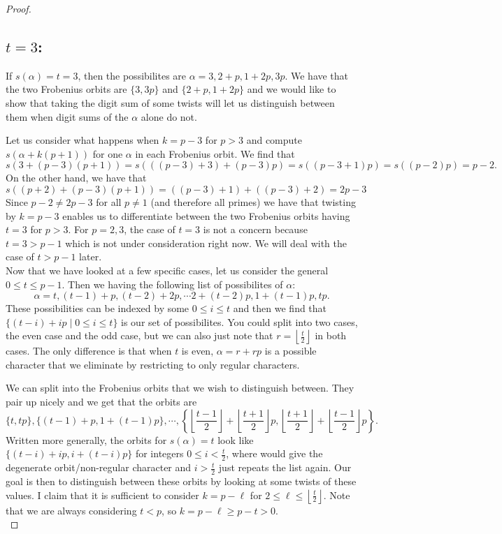 \documentclass[12pt]{article}
\theoremstyle{customtheorem}%
\theoremstyle{remark}
\theoremstyle{definition}
\numberwithin{equation}{section}
\numberwithin{theorem}{section}
\begin{document}
\begin{proof}
\subsection{$t = 3$:} If $s(\alpha) = t= 3$, then the possibilites are $\alpha = 3,2+p,1+2p,3p$. 
We have that the two Frobenius orbits are $\{3,3p\}$ and $\{2+p, 1+2p\}$ and we would like to show that taking the digit sum of some twists will let us distinguish between them when digit sums of the $\alpha$ alone do not.

Let us consider what happens when $k = p-3$ for $p > 3$ and compute $s(\alpha + k(p+1))$ for one $\alpha$ in each Frobenius orbit. 
We find that \[s(3 + (p-3)(p+1)) = s(((p-3)+3)+(p-3)p) = s((p-3+1)p) = s((p-2)p) = p-2.\] 
On the other hand, we have that \[s((p+2)+(p-3)(p+1)) = ((p-3)+1) + ((p-3)+2) =2p-3\]
Since $p-2 \neq 2p-3$ for all $p \neq 1$ (and therefore all primes) we have that twisting by $k = p-3$ enables us to differentiate between the two Frobenius orbits having $t = 3$ for $p > 3$. 
For $p = 2,3$, the case of $t = 3$ is not a concern because $t =3 > p-1$ which is not under consideration right now. 
We will deal with the case of $t > p-1$ later.
\\

Now that we have looked at a few specific cases, let us consider the general $0 \leq t \leq p-1$. 
Then we having the following list of possibilites of $\alpha$: \[\alpha = t, (t-1) + p, (t-2) +2 p, \cdots 2 + (t-2)p , 1 + (t-1)p, tp.\] 
These possibilities can be indexed by some $0 \leq i \leq t$ and then we find that $\{ (t-i) + i p \mid 0 \leq i \leq t\}$ is our set of possibilites. 
You could split into two cases, the even case and the odd case, but we can also just note that $r = \left\lfloor \frac{t}{2} \right\rfloor$ in both cases. 
The only difference is that when $t$ is even, $\alpha = r + rp$ is a possible character that we eliminate by restricting to only regular characters.

We can split into the Frobenius orbits that we wish to distinguish between. 
They pair up nicely and we get that the orbits are \[\{t, tp\}, \{(t-1)+p, 1+(t-1)p\}, \cdots ,\left\{\left\lfloor \frac{t-1}{2} \right\rfloor + \left\lfloor \frac{t+1}{2} \right\rfloor p, \left\lfloor \frac{t+1}{2} \right\rfloor + \left\lfloor \frac{t-1}{2} \right\rfloor p\right\}.\] 
Written more generally, the orbits for $s(\alpha) = t$ look like $\{(t-i) + ip, i + (t-i)p\}$ for integers $0 \leq i <  \frac{t}{2} $, where  would give the degenerate orbit/non-regular character and $i > \frac{t}{2}$ just repeats the list again. 
Our goal is then to distinguish between these orbits by looking at some twists of these values. I claim that it is sufficient to consider $k = p - \ell$ for $2 \leq \ell \leq \left\lfloor\frac{t}{2} \right\rfloor$. 
Note that we are always considering $t < p$, so $k = p - \ell \geq p - t > 0$. 
\\


\end{proof}
\end{document}
